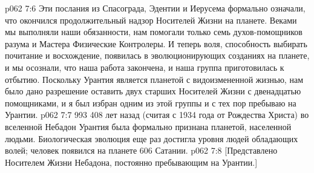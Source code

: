 \vs p062 7:6 Эти послания из Спасограда, Эдентии и Иерусема формально означали, что окончился продолжительный надзор Носителей Жизни на планете. Веками мы выполняли наши обязанности, нам помогали только семь духов\hyp{}помощников разума и Мастера Физические Контролеры. И теперь воля, способность выбирать почитание и восхождение, появилась в эволюционирующих созданиях на планете, и мы осознали, что наша работа закончена, и наша группа приготовилась к отбытию. Поскольку Урантия является планетой с видоизмененной жизнью, нам было дано разрешение оставить двух старших Носителей Жизни с двенадцатью помощниками, и я был избран одним из этой группы и с тех пор пребываю на Урантии.
\vs p062 7:7 993 408 лет назад (считая с 1934 года от Рождества Христа) во вселенной Небадон Урантия была формально признана планетой, населенной людьми. Биологическая эволюция еще раз достигла уровня людей обладающих волей; человек появился на планете 606 Сатании.
\vs p062 7:8 [Представлено Носителем Жизни Небадона, постоянно пребывающим на Урантии.]
